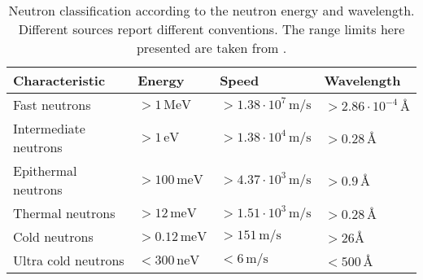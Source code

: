 \begin{table}[ht]
  \centering
  \caption[Neutron classification according to the neutron energy and wavelength]
  {Neutron classification according to the neutron energy and wavelength. Different sources report different conventions. The range  limits here presented are taken from \cite{psiNeutronRange}.}
  \label{chap1:tab:neutronsT}
  \begin{tabularx}{\linewidth}{lXXX}
    \toprule
    Characteristic        & Energy               & Speed                              & Wavelength                                    \\
    \midrule
    Fast neutrons         & $>1\,\mathrm{MeV}$   & $>1.38\cdot 10^{7}\,\mathrm{m/s}$  & $>2.86\cdot 10^{-4}\,\mathrm{\si{\angstrom}}$ \\
    Intermediate neutrons & $>1\,\mathrm{eV}$    & $>1.38 \cdot 10^{4}\,\mathrm{m/s}$ & $>0.28\,\mathrm{\si{\angstrom}}$              \\
    Epithermal neutrons   & $>100\,\mathrm{meV}$ & $>4.37 \cdot 10^{3}\,\mathrm{m/s}$ & $>0.9\,\mathrm{\si{\angstrom}}$               \\
    Thermal neutrons      & $>12\,\mathrm{meV}$   & $>1.51 \cdot 10^{3}\,\mathrm{m/s}$ & $>0.28\,\mathrm{\si{\angstrom}}$              \\
    Cold neutrons         & $>0.12\,\mathrm{meV}$ & $>151\,\mathrm{m/s}$               & $>26\mathrm{\si{\angstrom}}$                  \\
    Ultra cold neutrons   & $<300\,\mathrm{neV}$ & $<6\,\mathrm{m/s}$                 & $<500\,\mathrm{\si{\angstrom}}$               \\
    \bottomrule
  \end{tabularx}
\end{table}
